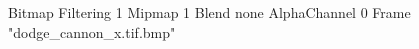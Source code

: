 {Bitmap
	{Filtering 1}
	{Mipmap 1}
	{Blend none}
	{AlphaChannel 0}
	{Frame "dodge_cannon_x.tif.bmp"}
}

